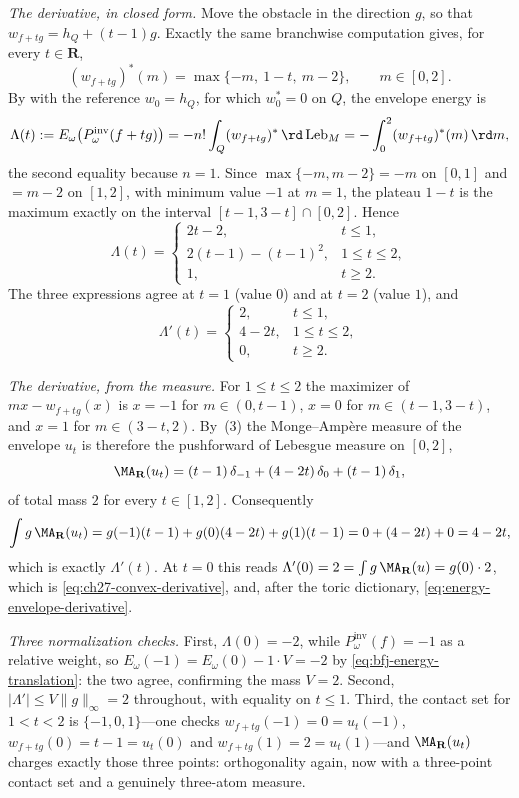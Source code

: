 \begin{example}
\emph{The derivative, in closed form.}  Move the obstacle in the direction
\(g\), so that \(w_{f+tg}=h_Q+(t-1)g\).  Exactly the same branchwise
computation gives, for every \(t\in\mathbf R\),
\[
 (w_{f+tg})^*(m)=\max\{-m,\ 1-t,\ m-2\},
 \qquad m\in[0,2].
\]
By  with the reference \(w_0=h_Q\), for which
\(w_0^*=0\) on \(Q\), the envelope energy is
\[
 \Lambda(t):=E_\omega\bigl(P^{\mathrm{inv}}_\omega(f+tg)\bigr)
 =-n!\int_Q(w_{f+tg})^*\,\rd\operatorname{Leb}_M
 =-\int_0^2(w_{f+tg})^*(m)\,\rd m ,
\]
the second equality because \(n=1\).
Since \(\max\{-m,m-2\}=-m\) on \([0,1]\) and \(=m-2\) on \([1,2]\), with
minimum value \(-1\) at \(m=1\), the plateau \(1-t\) is the maximum exactly
on the interval \([t-1,3-t]\cap[0,2]\).  Hence
\[
 \Lambda(t)=
 \begin{cases}
  2t-2, & t\leq1,\\[2pt]
  2(t-1)-(t-1)^2, & 1\leq t\leq2,\\[2pt]
  1, & t\geq2 .
 \end{cases}
\]
The three expressions agree at \(t=1\) (value \(0\)) and at \(t=2\) (value
\(1\)), and
\[
 \Lambda'(t)=
 \begin{cases}
  2,& t\leq1,\\
  4-2t,& 1\leq t\leq2,\\
  0,& t\geq2 .
 \end{cases}
\]

\emph{The derivative, from the measure.}  For \(1\leq t\leq2\) the
maximizer of \(mx-w_{f+tg}(x)\) is \(x=-1\) for \(m\in(0,t-1)\), \(x=0\) for
\(m\in(t-1,3-t)\), and \(x=1\) for \(m\in(3-t,2)\).  By
\,(3) the Monge--Amp\`ere measure of
the envelope \(u_t\) is therefore the pushforward of Lebesgue measure on
\([0,2]\),
\[
 \MA_{\mathbf R}(u_t)
 =(t-1)\,\delta_{-1}+(4-2t)\,\delta_0+(t-1)\,\delta_1,
\]
of total mass \(2\) for every \(t\in[1,2]\).  Consequently
\[
 \int g\,\MA_{\mathbf R}(u_t)
 =g(-1)(t-1)+g(0)(4-2t)+g(1)(t-1)
 =0+(4-2t)+0=4-2t,
\]
which is exactly \(\Lambda'(t)\).  At \(t=0\) this reads
\(\Lambda'(0)=2=\int g\,\MA_{\mathbf R}(u)=g(0)\cdot2\), which is
\eqref{eq:ch27-convex-derivative}, and, after the toric dictionary,
\eqref{eq:energy-envelope-derivative}.

\emph{Three normalization checks.}  First, \(\Lambda(0)=-2\), while
\(P^{\mathrm{inv}}_\omega(f)=-1\) as a relative weight, so
\(E_\omega(-1)=E_\omega(0)-1\cdot V=-2\) by
\eqref{eq:bfj-energy-translation}: the two agree, confirming the mass
\(V=2\).  Second, \(|\Lambda'|\leq V\lVert g\rVert_\infty=2\) throughout,
with equality on \(t\leq1\).  Third, the contact set for
\(1<t<2\) is \(\{-1,0,1\}\)---one checks
\(w_{f+tg}(-1)=0=u_t(-1)\), \(w_{f+tg}(0)=t-1=u_t(0)\) and
\(w_{f+tg}(1)=2=u_t(1)\)---and \(\MA_{\mathbf R}(u_t)\) charges exactly
those three points: orthogonality again, now with a three-point contact set
and a genuinely three-atom measure.
\end{example}

